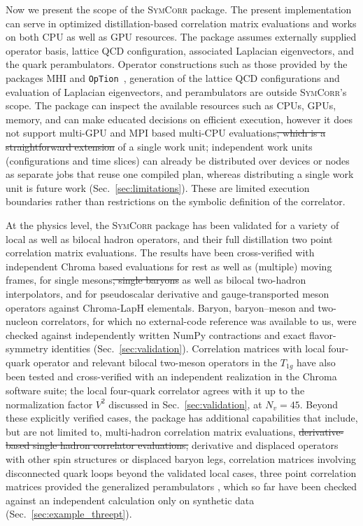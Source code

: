 \documentclass[a4paper,fleqn]{cas-dc}
\newcommand{\del}[1]{{\color{red}\sout{#1}}}
\newcommand{\add}[1]{{\color{blue}#1}}
\begin{document}
Now we present the scope of the \textsc{SymCorr} package. The present implementation can serve in optimized distillation-based correlation matrix evaluations and works on both CPU as well as GPU resources. The package assumes externally supplied operator basis, lattice QCD configuration, associated Laplacian eigenvectors, and the quark perambulators. Operator constructions such as those provided by the packages MHI and \texttt{OpTion}~\cite{PhysRevD.109.094516,Yan:2025op}, generation of the lattice QCD configurations \cite{openQCD, MILC} and evaluation of Laplacian eigenvectors, and perambulators \cite{quada_laph} are outside \textsc{SymCorr}'s scope. The package can inspect the available resources such as CPUs, GPUs, memory, and can make educated decisions on efficient execution, however it does not support multi-GPU and MPI based multi-CPU evaluations\del{, which is a straightforward extension}\add{ of a single work unit; independent work units (configurations and time slices) can already be distributed over devices or nodes as separate jobs that reuse one compiled plan, whereas distributing a single work unit is future work (Sec.~\ref{sec:limitations})}. These are limited execution boundaries rather than restrictions on the symbolic definition of the correlator.

At the physics level, the \textsc{SymCorr} package has been validated for a variety of local as well as bilocal hadron operators, and their full distillation two point correlation matrix evaluations. The results have been cross-verified with independent Chroma based evaluations for rest as well as (multiple) moving frames, for single mesons\del{, single baryons} as well as bilocal two-hadron interpolators\add{, and for pseudoscalar derivative and gauge-transported meson operators against Chroma-LapH elementals. Baryon, baryon--meson and two-nucleon correlators, for which no external-code reference was available to us, were checked against independently written NumPy contractions and exact flavor-symmetry identities (Sec.~\ref{sec:validation})}.  Correlation matrices with local four-quark operator and relevant bilocal two-meson operators in the $T_{1g}$ have also been tested and cross-verified with an independent realization in the Chroma software suite\add{; the local four-quark correlator agrees with it up to the normalization factor $V^2$ discussed in Sec.~\ref{sec:validation}, at $N_v=45$}. Beyond these explicitly verified cases, the package has additional capabilities that include, but are not limited to, multi-hadron correlation matrix evaluations, \del{derivative-based single hadron correlator evaluations,}\add{ derivative and displaced operators with other spin structures or displaced baryon legs,} correlation matrices involving disconnected quark loops\add{ beyond the validated local cases}, three point correlation matrices provided the generalized perambulators \cite{}\add{, which so far have been checked against an independent calculation only on synthetic data (Sec.~\ref{sec:example_threept})}. 
\end{document}

